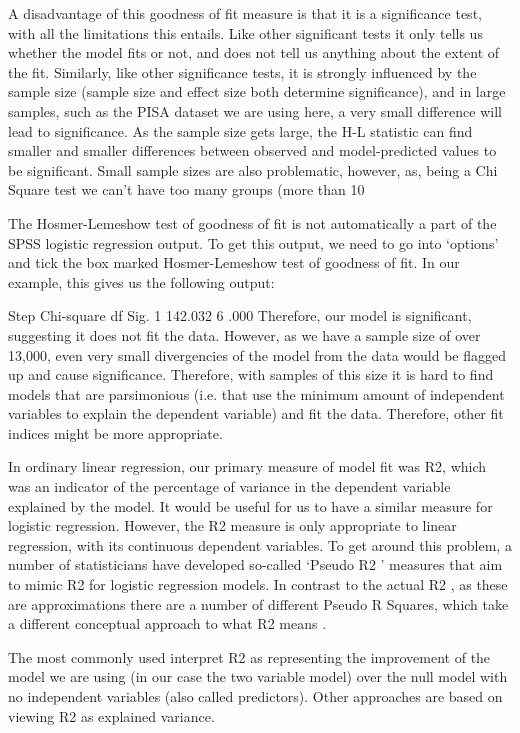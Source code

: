 A disadvantage of this goodness of fit measure is that it is a significance test, with all the limitations this entails. Like other significant tests it only tells us whether the model fits or not, and does not tell us anything about the extent of the fit. Similarly, like other significance tests, it is strongly influenced by the sample size (sample size and effect size both determine significance), and in large samples, such as the PISA dataset we are using here, a very small difference will lead to significance. As the sample size gets large, the H-L statistic can find smaller and smaller differences between observed and model-predicted values to be significant. Small sample sizes are also problematic, however, as, being a Chi Square test we can’t have too many groups (more than 10%

The Hosmer-Lemeshow test of goodness of fit is not automatically a part of the SPSS logistic regression output. To get this output, we need to go into ‘options’ and tick the box marked Hosmer-Lemeshow test of goodness of fit. In our example, this gives us the following output:

 Step	 Chi-square	df 	 Sig.
 1	 142.032	 6	 .000
Therefore, our model is significant, suggesting it does not fit the data. However, as we have a sample size of over 13,000, even very small divergencies of the model from the data would be flagged up and cause significance. Therefore, with samples of this size it is hard to find models that are parsimonious (i.e. that use the minimum amount of independent variables to explain the dependent variable) and fit the data. Therefore, other fit indices might be more appropriate.

 In ordinary linear regression, our primary measure of model fit was R2, which was an indicator of the percentage of variance in the dependent variable explained by the model. It would be useful for us to have a similar measure for logistic regression. However, the R2 measure is only appropriate to linear regression, with its continuous dependent variables. To get around this problem, a number of statisticians have developed so-called ‘Pseudo R2 ’ measures that aim to mimic R2 for logistic regression models. In contrast to the actual R2 , as these are approximations there are a number of different Pseudo R Squares, which take a different conceptual approach to what R2 means .

The most commonly used interpret R2 as representing the improvement of the model we are using (in our case the two variable model) over the null model with no independent variables (also called predictors). Other approaches are based on viewing R2 as explained variance.

